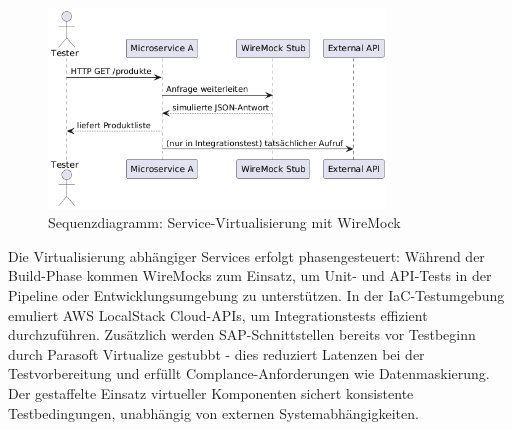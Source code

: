 \begin{figure}[h!]
    \centering
    \includegraphics[width=0.8\textwidth]{fig/servicevirti.png}
    \caption{Sequenzdiagramm: Service-Virtualisierung mit WireMock}
    \label{fig:sequence}
\end{figure}

Die Virtualisierung abhängiger Services erfolgt phasengesteuert: Während der Build-Phase kommen
WireMocks zum Einsatz, um Unit- und API-Tests in der Pipeline oder Entwicklungsumgebung zu
unterstützen. In der IaC-Testumgebung emuliert AWS LocalStack Cloud-APIs, um Integrationstests
effizient durchzuführen. Zusätzlich werden SAP-Schnittstellen bereits vor Testbeginn durch Parasoft
Virtualize gestubbt - dies reduziert Latenzen bei der Testvorbereitung und erfüllt Complance-Anforderungen
wie Datenmaskierung. Der gestaffelte Einsatz virtueller Komponenten sichert konsistente Testbedingungen,
unabhängig von externen Systemabhängigkeiten.

